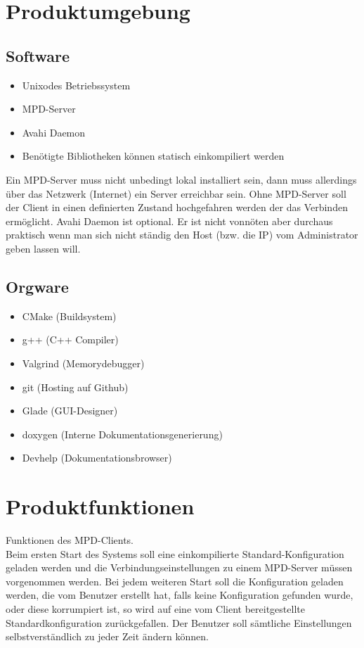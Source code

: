 \section{Produktumgebung}
\subsection{Software}
\begin{itemize}
	\item Unixodes Betriebssystem
	\item MPD-Server 
	\item Avahi Daemon
	\item Benötigte Bibliotheken können statisch einkompiliert werden
\end{itemize}
Ein MPD-Server muss nicht unbedingt lokal installiert sein, dann muss 
allerdings über das Netzwerk (Internet) ein Server erreichbar sein.
Ohne MPD-Server soll der Client in einen definierten Zustand hochgefahren werden der das Verbinden ermöglicht.
Avahi Daemon ist optional. Er ist nicht vonnöten aber durchaus praktisch wenn man sich nicht ständig den Host (bzw. die IP) 
vom Administrator geben lassen will.

\subsection{Orgware}
\begin{itemize}
	\item CMake (Buildsystem)
	\item g++ (C++ Compiler)
	\item Valgrind (Memorydebugger)
	\item git (Hosting auf Github) 
	\item Glade (GUI-Designer)
	\item doxygen  (Interne Dokumentationsgenerierung)
	\item Devhelp (Dokumentationsbrowser)
\end{itemize}

\section{Produktfunktionen}
Funktionen des MPD-Clients.\ \\
Beim ersten Start des Systems soll eine einkompilierte Standard-Konfiguration geladen werden und die Verbindungseinstellungen
zu einem MPD-Server müssen vorgenommen werden. Bei jedem weiteren Start soll die Konfiguration geladen werden,
die vom Benutzer erstellt hat,  falls keine Konfiguration gefunden wurde, oder diese korrumpiert ist,
so wird auf eine vom Client bereitgestellte Standardkonfiguration zurückgefallen. Der Benutzer soll sämtliche
Einstellungen selbstverständlich zu jeder Zeit ändern können.


